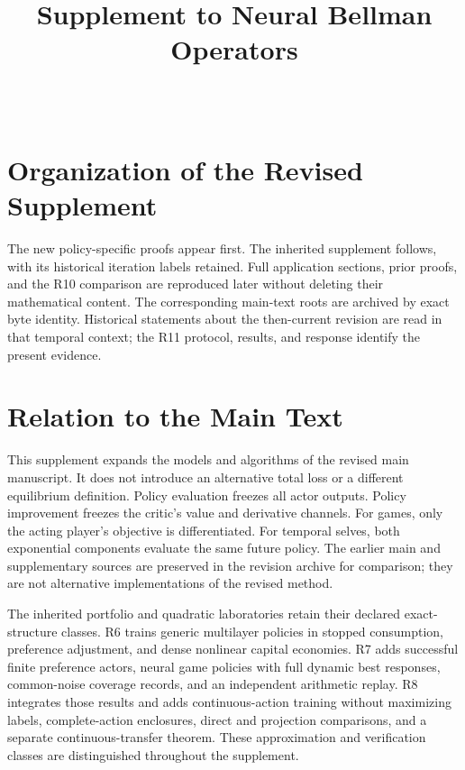 \documentclass[ecta,draft]{econsocart}
\theoremstyle{definition}
\theoremstyle{remark}
\begin{document}
\begin{frontmatter}
\title{Supplement to Neural Bellman Operators}
\begin{aug}
\author[id=au1,addressref={add1}]{~}
\address[id=add1]{Peking University}
\end{aug}
\end{frontmatter}

\section{Organization of the Revised Supplement}
The new policy-specific proofs appear first. The inherited supplement follows, with its historical iteration labels retained. Full application sections, prior proofs, and the R10 comparison are reproduced later without deleting their mathematical content. The corresponding main-text roots are archived by exact byte identity. Historical statements about the then-current revision are read in that temporal context; the R11 protocol, results, and response identify the present evidence.

\section{Relation to the Main Text}
This supplement expands the models and algorithms of the revised main manuscript. It does not introduce an alternative total loss or a different equilibrium definition. Policy evaluation freezes all actor outputs. Policy improvement freezes the critic's value and derivative channels. For games, only the acting player's objective is differentiated. For temporal selves, both exponential components evaluate the same future policy. The earlier main and supplementary sources are preserved in the revision archive for comparison; they are not alternative implementations of the revised method.

The inherited portfolio and quadratic laboratories retain their declared exact-structure classes. R6 trains generic multilayer policies in stopped consumption, preference adjustment, and dense nonlinear capital economies. R7 adds successful finite preference actors, neural game policies with full dynamic best responses, common-noise coverage records, and an independent arithmetic replay. R8 integrates those results and adds continuous-action training without maximizing labels, complete-action enclosures, direct and projection comparisons, and a separate continuous-transfer theorem. These approximation and verification classes are distinguished throughout the supplement.
\end{document}
